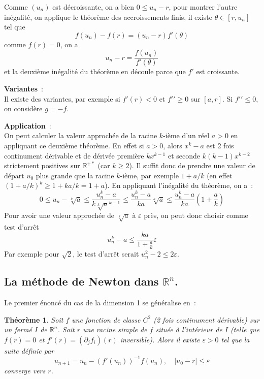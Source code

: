 \documentclass[a4paper,11pt]{article}
\newtheorem{thm}{Théorème}
\newcommand{\R}{{\mathbb{R}}}
\begin{document}
\begin{giacjshere}
Comme $(u_n)$ est d\'ecroissante, on a bien $0 \leq u_n -r$,
pour montrer l'autre in\'egalit\'e, on applique le th\'eor\`eme
des accroissements finis, il existe $\theta \in [r,u_n]$ tel que
\[ f(u_n)-f(r)=(u_n-r)f'(\theta) \]
comme $f(r)=0$, on a
\[ u_n-r = \frac{f(u_n)}{f'(\theta)} \]
et la deuxi\`eme in\'egalit\'e du th\'eor\`eme
en d\'ecoule parce que $f'$ est croissante.

{\bf Variantes}~:\\
Il existe des variantes, par exemple si $f'(r)<0$ et $f'{'} \geq 0$
sur $[a,r]$. Si $f'{'} \leq 0$, on considère $g=-f$.

{\bf Application}~:\\
On peut calculer la valeur approch\'ee de la 
racine $k$-i\`eme d'un r\'eel $a>0$ en appliquant ce deuxi\`eme
th\'eor\`eme. En effet si
$a>0$, alors $x^k-a$ est 2 fois continument d\'erivable et 
de d\'eriv\'ee premi\`ere $kx^{k-1} $ et
seconde $k(k-1)x^{k-2}$ strictement positives sur $\R^{+\ast}$ (car $k \geq 2$).
Il suffit donc de prendre une valeur de d\'epart $u_0$ plus grande que
la racine $k$-i\`eme, par exemple $1+a/k$ (en effet
$(1+a/k)^k \geq 1+k a/k=1+a$).
En appliquant l'in\'egalit\'e du th\'eor\`eme, on a~:
\[ 0 \leq u_n - \sqrt[k]{a} \leq  
\frac{u_n^k - a}{k\sqrt[k]{a}^{k-1} }
\leq \frac{u_n^k-a}{ka}  \sqrt[k]{a}
\leq \frac{u_n^k-a}{ka} (1+\frac{a}{k})
\]
Pour avoir une valeur approch\'ee de $\sqrt[k]{a}$ \`a $\varepsilon$ pr\`es,
on peut donc choisir comme test d'arr\^et 
\[ u_n^k -a \leq \frac{ka}{1+\frac{a}{k}} \varepsilon \]
Par exemple pour $\sqrt{2}$, le test d'arr\^et serait 
$u_n^2-2 \leq 2 \varepsilon$.

\subsection{La m\'ethode de Newton dans $\R^n$.}
Le premier \'enonc\'e du cas de la dimension 1 se g\'en\'eralise en~:
\begin{thm} 
Soit $f$ une fonction de classe $C^2$ (2 fois continument d\'erivable)
sur un ferm\'e $I$ de $\R^n$. Soit $r$ une racine simple de $f$
situ\'ee \`a l'int\'erieur de $I$
(telle que $f(r)=0$ et $f'(r)=(\partial_j f_i)(r)$ inversible). 
Alors il existe $\varepsilon>0$
tel que la suite d\'efinie par
\[ u_{n+1} = u_n -(f'(u_n) )^{-1}f(u_n), \quad |u_0-r| \leq \varepsilon \]
converge vers $r$.


\end{thm}
\end{giacjshere}
\end{document}
